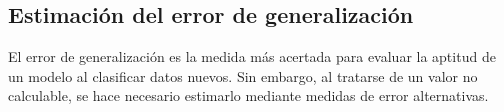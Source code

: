 %
%
\subsection{Estimación del error de generalización}
%
El error de generalización es la medida más acertada para evaluar la
aptitud de un modelo al clasificar datos nuevos.  Sin embargo, al
tratarse de un valor no calculable, se hace necesario estimarlo
mediante medidas de error alternativas.
